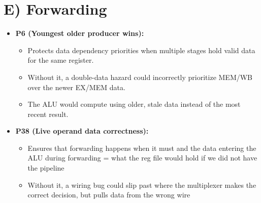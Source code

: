 \documentclass[11pt]{article}
\begin{document}
\section*{E) Forwarding}
\begin{itemize}
    \item \textbf{P6 (Youngest older producer wins):} 
    \begin{itemize}
        \item Protects data dependency priorities when multiple stages hold valid data for the same register.
        \item Without it, a double-data hazard could incorrectly prioritize MEM/WB over the newer EX/MEM data.
        \item The ALU would compute using older, stale data instead of the most recent result.
    \end{itemize}

    \item \textbf{P38 (Live operand data correctness):} 
    \begin{itemize}
        \item Ensures that forwarding happens when it must and the data entering the ALU during forwarding = what the reg file would hold if we did not have the pipeline
        \item Without it, a wiring bug could slip past where the multiplexer makes the correct decision, but pulls data from the wrong wire
    \end{itemize}
\end{itemize}
\end{document}
